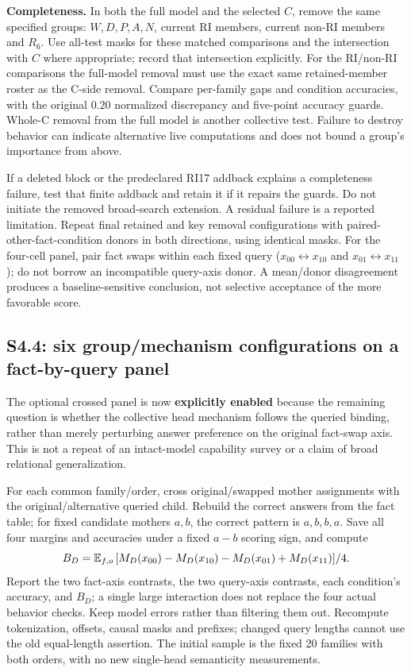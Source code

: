 \textbf{Completeness.} In both the full model and the selected $C$, remove the same specified groups: $W,D,P,A,N$, current RI members, current non-RI members and $R_6$. Use all-test masks for these matched comparisons and the intersection with $C$ where appropriate; record that intersection explicitly. For the RI/non-RI comparisons the full-model removal must use the exact same retained-member roster as the C-side removal. Compare per-family gaps and condition accuracies, with the original $0.20$ normalized discrepancy and five-point accuracy guards. Whole-C removal from the full model is another collective test. Failure to destroy behavior can indicate alternative live computations and does not bound a group's importance from above.

If a deleted block or the predeclared RI17 addback explains a completeness failure, test that finite addback and retain it if it repairs the guards. Do not initiate the removed broad-search extension. A residual failure is a reported limitation. Repeat final retained and key removal configurations with paired-other-fact-condition donors in both directions, using identical masks. For the four-cell panel, pair fact swaps within each fixed query ($x_{00}\leftrightarrow x_{10}$ and $x_{01}\leftrightarrow x_{11}$); do not borrow an incompatible query-axis donor. A mean/donor disagreement produces a baseline-sensitive conclusion, not selective acceptance of the more favorable score.

\subsection{S4.4: six group/mechanism configurations on a fact-by-query panel}
The optional crossed panel is now \textbf{explicitly enabled} because the remaining question is whether the collective head mechanism follows the queried binding, rather than merely perturbing answer preference on the original fact-swap axis. This is not a repeat of an intact-model capability survey or a claim of broad relational generalization.

For each common family/order, cross original/swapped mother assignments with the original/alternative queried child. Rebuild the correct answers from the fact table; for fixed candidate mothers $a,b$, the correct pattern is $a,b,b,a$. Save all four margins and accuracies under a fixed $a-b$ scoring sign, and compute
\[
B_D=\mathbb{E}_{f,o}\,[M_D(x_{00})-M_D(x_{10})-M_D(x_{01})+M_D(x_{11})]/4.
\]
Report the two fact-axis contrasts, the two query-axis contrasts, each condition's accuracy, and $B_D$; a single large interaction does not replace the four actual behavior checks. Keep model errors rather than filtering them out. Recompute tokenization, offsets, causal masks and prefixes; changed query lengths cannot use the old equal-length assertion. The initial sample is the fixed 20 families with both orders, with no new single-head semanticity measurements.

